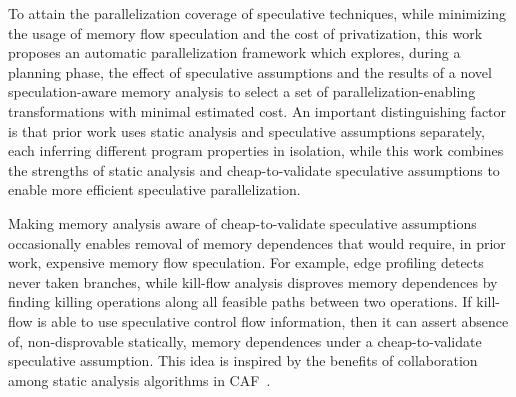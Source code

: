 %

To attain the parallelization coverage of speculative techniques,
while minimizing the usage of memory flow speculation and the cost of
privatization, this work proposes an automatic parallelization
framework which explores, during a planning phase, the effect of
speculative assumptions and the results of a novel speculation-aware
memory analysis to select a set of parallelization-enabling
transformations with minimal estimated cost.
%
%
An important distinguishing factor is that prior work uses static
analysis and speculative assumptions separately, each inferring
different program properties in isolation, while this work combines
the strengths of static analysis and cheap-to-validate speculative
assumptions to enable more efficient speculative parallelization.
%
%
%

Making memory analysis aware of cheap-to-validate speculative
assumptions occasionally enables removal of memory dependences that
would require, in prior work, expensive memory flow speculation.
%
For example,
edge profiling detects never taken branches, while kill-flow analysis
disproves memory dependences by finding killing operations along all
feasible paths between two operations. If kill-flow is able to use
speculative control flow information, then it can assert absence of,
non-disprovable statically, memory dependences under a
cheap-to-validate speculative assumption.
%
This idea is inspired by the benefits of collaboration among static
analysis algorithms in CAF~\cite{johnson:17:cgo}.

